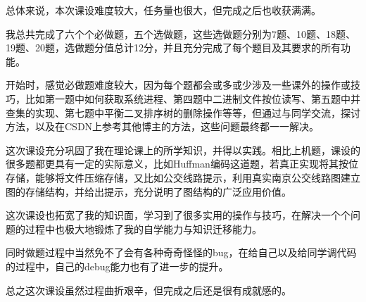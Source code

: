 \documentclass[a4paper,11pt,UTF8]{ctexart}
\begin{document}
总体来说，本次课设难度较大，任务量也很大，但完成之后也收获满满。\par
我总共完成了六个个必做题，五个选做题，这些选做题分别为7题、10题、18题、19题、20题，选做题分值总计12分，并且充分完成了每个题目及其要求的所有功能。\par
开始时，感觉必做题难度较大，因为每个题都会或多或少涉及一些课外的操作或技巧，比如第一题中如何获取系统进程、第四题中二进制文件按位读写、第五题中并查集的实现、第七题中平衡二叉排序树的删除操作等等，但通过与同学交流，探讨方法，以及在CSDN上参考其他博主的方法，这些问题最终都一一解决。\par
这次课设充分巩固了我在理论课上的所学知识，并得以实践。相比上机题，课设的很多题都更具有一定的实际意义，比如Huffman编码这道题，若真正实现将其按位存储，能够将文件压缩存储，又比如公交线路提示，利用真实南京公交线路图建立图的存储结构，并给出提示，充分说明了图结构的广泛应用价值。\par
这次课设也拓宽了我的知识面，学习到了很多实用的操作与技巧，在解决一个个问题的过程中也极大地锻炼了我的自学能力与知识迁移能力。\par
同时做题过程中当然免不了会有各种奇奇怪怪的bug，在给自己以及给同学调代码的过程中，自己的debug能力也有了进一步的提升。\par
总之这次课设虽然过程曲折艰辛，但完成之后还是很有成就感的。\par

\setlength{\parskip}{6pt}  %
\vspace{4cm}
\end{document}
